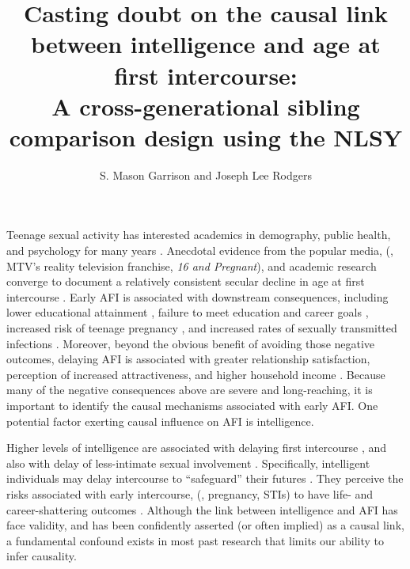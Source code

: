 \documentclass[a4paper,man,apacite,natbib,12pt,longtable]{apa6}\usepackage[]{graphicx}\usepackage[]{color}
\title{Casting doubt on the causal link between intelligence and age at first intercourse:\\ A cross-generational sibling comparison design using the NLSY}
\author{S. Mason Garrison and Joseph Lee Rodgers}
\affiliation{Vanderbilt University}
\begin{document}
\maketitle

%











\section{ }\vspace{-.8cm}
Teenage sexual activity has interested academics in demography, public health, and psychology for many years \citep{Brooks-Gunn1989,kinsey1948sexual,santelli2000adolescent}. Anecdotal evidence from the popular media, (\eg, MTV's reality television franchise, \textit{16 and Pregnant}\nocite{mtv}), and academic research converge to document a relatively consistent secular decline in age at first intercourse  \citep[AFI; see][]{bozon2003,finer2007trends,Kann2014}. Early AFI is associated with downstream consequences, including lower educational attainment \citep{Harden2012,Spriggs2008,Wellings2001}, failure to meet education and career goals \citep{halpern2000smart}, increased risk of teenage pregnancy \citep{Leitenberg2000,Wellings2001}, and increased rates of sexually transmitted infections \citep[STIs;][]{kaestle2005young}. Moreover, beyond the obvious benefit of avoiding those negative outcomes, delaying AFI is associated with greater relationship satisfaction, perception of increased attractiveness, and higher household income \citep{Harden2012}. Because many of the negative consequences above are severe and long-reaching, it is important to identify the causal mechanisms associated with early AFI. One potential factor exerting causal influence on AFI is intelligence.

Higher levels of intelligence are associated with delaying first intercourse \citep{halpern2000smart,mott1983early,Paul2000,Woodward2001}, and also with delay of less-intimate sexual involvement \citep{halpern2000smart}. Specifically, intelligent individuals may delay intercourse to ``safeguard'' their futures \citep{kirby2002effective, manlove1998influence, raffaelli2003sexual}. They perceive the risks associated with early intercourse, (\eg, pregnancy, STIs) to have life- and career-shattering outcomes \citep{halpern2000smart,harden2011don}. Although the link between intelligence and AFI has face validity, and has been confidently asserted (or often implied) as a causal link, a fundamental confound exists in most past research that limits our ability to infer causality.
\end{document}
